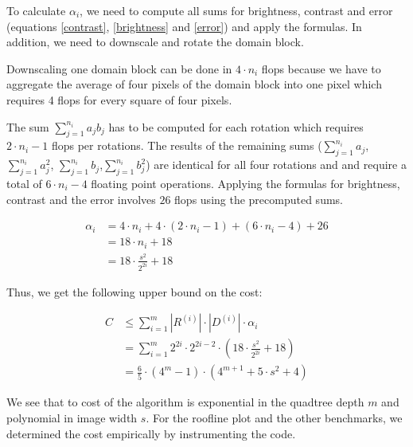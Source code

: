 To calculate $\alpha_{i}$, we need to compute all sums for brightness,
contrast and error (equations \eqref{contrast}, \eqref{brightness} and
\eqref{error}) and apply the formulas. In addition, we need to downscale and
rotate the domain block.

Downscaling one domain block can be done in $4\cdot n_{i}$ flops because we have
to aggregate the average of four pixels of the domain block into one pixel which
requires 4 flops for every square of four pixels.

The sum $\sum_{j=1}^{n_{i}} a_j b_j$ has to be computed for each rotation
which requires $2\cdot n_{i}-1$ flops per rotations. The results of the
remaining sums ($\sum_{j=1}^{n_{i}} a_j$, $\sum_{j=1}^{n_{i}} a_j^2$,
$\sum_{j=1}^{n_{i}} b_j$,$\sum_{j=1}^{n_{i}} b_j^2$) are identical for all four
rotations and and require a total of $6\cdot n_{i}-4$ floating point operations.
Applying the formulas for brightness, contrast and the error involves $26$ flops
using the precomputed sums.

\begin{align*}
  \alpha_i &= 4\cdot n_{i} + 4 \cdot (2\cdot n_{i}-1) + (6\cdot n_{i}-4) +  26\\
           &= 18\cdot n_{i} + 18 \\
           &= 18 \cdot \frac{s^2}{2^{2i}} + 18
\end{align*}

Thus, we get the following upper bound on the cost:

\begin{align*}
C &\leq \sum_{i=1}^m |R^{(i)}| \cdot |D^{(i)}| \cdot \alpha_i \\
  &= \sum_{i=1}^m 2^{2i} \cdot 2^{2i-2} \cdot (18 \cdot \frac{s^2}{2^{2i}} + 18) \\
  &= \frac{6}{5}\cdot (4^{m}-1)\cdot (4^{m+1} + 5\cdot s^{2} + 4)
\end{align*}

We see that to cost of the algorithm is exponential in the quadtree depth $m$
and polynomial in image width $s$. For the roofline plot and the other benchmarks,
we determined the cost empirically by instrumenting the code.

